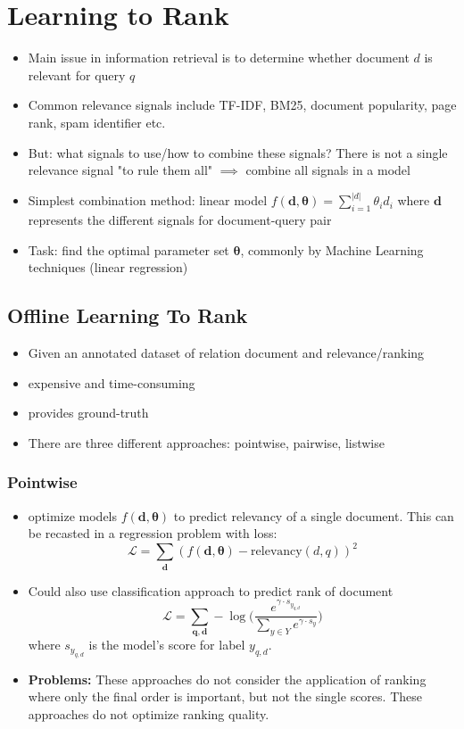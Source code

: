 \section{Learning to Rank}
\begin{itemize}
	\item Main issue in information retrieval is to determine whether document $d$ is relevant for query $q$
	\item Common relevance signals include TF-IDF, BM25, document popularity, page rank, spam identifier etc.
	\item But: what signals to use/how to combine these signals? There is not a single relevance signal "to rule them all" $\implies$ combine all signals in a model
	\item Simplest combination method: linear model $f(\bm{d},\bm{\theta}) = \sum\limits_{i=1}^{|d|} \theta_i d_i$ where $\bm{d}$ represents the different signals for document-query pair
	\item Task: find the optimal parameter set $\bm{\theta}$, commonly by Machine Learning techniques (linear regression)
\end{itemize}
\subsection{Offline Learning To Rank}
\begin{itemize}
	\item Given an annotated dataset of relation document and relevance/ranking
	\item expensive and time-consuming
	\item provides ground-truth
	\item There are three different approaches: pointwise, pairwise, listwise
\end{itemize}
\subsubsection{Pointwise} 
\begin{itemize}
	\item optimize models $f(\bm{d},\bm{\theta})$ to predict relevancy of a single document. This can be recasted in a regression problem with loss:
	$$\mathcal{L}=\sum_{\bm{d}} \left(f(\bm{d},\bm{\theta}) - \text{relevancy}(d,q)\right)^2$$
	\item Could also use classification approach to predict rank of document
	$$\mathcal{L}=\sum_{\bm{q,d}} - \log \Big( \dfrac{e^{\gamma \cdot s_{y_{q,d}}}}{\sum_{y \in Y} e^{\gamma \cdot s_y}} \Big)$$
	where $s_{y_{q,d}}$ is the model's score for label $y_{q,d}$.
	\item \textbf{Problems:} These approaches do not consider the application of ranking where only the final order is important, but not the single scores. These approaches do not optimize ranking quality.
\end{itemize}
